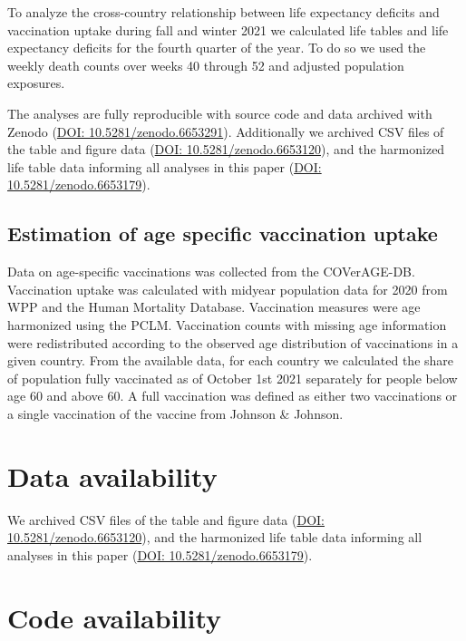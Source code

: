 \documentclass[12pt]{article}
\begin{document}
To analyze the cross-country relationship between life expectancy deficits and vaccination uptake during fall and winter 2021 we calculated life tables and life expectancy deficits for the fourth quarter of the year. To do so we used the weekly death counts over weeks 40 through 52 and adjusted population exposures.

The analyses are fully reproducible with source code and data archived with Zenodo (\href{https://zenodo.org/record/6653291}{DOI:  10.5281/zenodo.6653291}). Additionally we archived CSV files of the table and figure data (\href{https://zenodo.org/record/6653120}{DOI: 10.5281/zenodo.6653120}), and the harmonized life table data informing all analyses in this paper (\href{https://zenodo.org/record/6653179}{DOI: 10.5281/zenodo.6653179}).

\subsection*{Estimation of age specific vaccination uptake}

Data on age-specific vaccinations was collected from the COVerAGE-DB.\citealp{Riffe2021} Vaccination uptake was calculated with midyear population data for 2020 from WPP\citealp{UnitedNations2021} and the Human Mortality Database. Vaccination measures were age harmonized using the PCLM. Vaccination counts with missing age information were redistributed according to the observed age distribution of vaccinations in a given country. From the available data, for each country we calculated the share of population fully vaccinated as of October 1st 2021 separately for people below age 60 and above 60. A full vaccination was defined as either two vaccinations or a single vaccination of the vaccine from Johnson \& Johnson.

\clearpage

\section*{Data availability}

We archived CSV files of the table and figure data (\href{https://zenodo.org/record/6653120}{DOI: 10.5281/zenodo.6653120}), and the harmonized life table data informing all analyses in this paper (\href{https://zenodo.org/record/6653179}{DOI: 10.5281/zenodo.6653179}).

\section*{Code availability}
\end{document}

